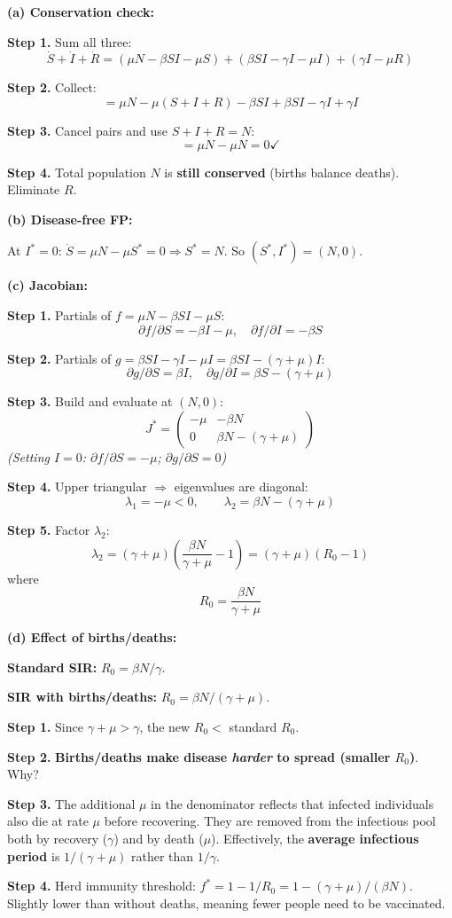 \documentclass[10pt]{article}
\newcommand{\stepwhy}[1]{\textcolor{blue!60!black}{\small\textit{(#1)}}}
\begin{document}
\begin{solution}
\textbf{(a) Conservation check:}

\textbf{Step 1.} Sum all three:
\[
\dot S + \dot I + \dot R = (\mu N - \beta SI - \mu S) + (\beta SI - \gamma I - \mu I) + (\gamma I - \mu R)
\]

\textbf{Step 2.} Collect:
\[
= \mu N - \mu(S + I + R) - \beta SI + \beta SI - \gamma I + \gamma I
\]

\textbf{Step 3.} Cancel pairs and use $S+I+R = N$:
\[
= \mu N - \mu N = 0 \checkmark
\]

\textbf{Step 4.} Total population $N$ is \textbf{still conserved} (births balance deaths). Eliminate $R$.

\medskip\textbf{(b) Disease-free FP:}

At $I^* = 0$: $\dot S = \mu N - \mu S^* = 0 \Rightarrow S^* = N$. So $(S^*, I^*) = (N, 0)$.

\medskip\textbf{(c) Jacobian:}

\textbf{Step 1.} Partials of $f = \mu N - \beta SI - \mu S$:
\[
\partial f/\partial S = -\beta I - \mu, \quad \partial f/\partial I = -\beta S
\]

\textbf{Step 2.} Partials of $g = \beta SI - \gamma I - \mu I = \beta SI - (\gamma+\mu)I$:
\[
\partial g/\partial S = \beta I, \quad \partial g/\partial I = \beta S - (\gamma+\mu)
\]

\textbf{Step 3.} Build and evaluate at $(N, 0)$:
\[
J^* = \begin{pmatrix} -\mu & -\beta N \\ 0 & \beta N - (\gamma+\mu) \end{pmatrix}
\]
\stepwhy{Setting $I=0$: $\partial f/\partial S = -\mu$; $\partial g/\partial S = 0$}

\textbf{Step 4.} Upper triangular $\Rightarrow$ eigenvalues are diagonal:
\[
\lambda_1 = -\mu < 0, \qquad \lambda_2 = \beta N - (\gamma+\mu)
\]

\textbf{Step 5.} Factor $\lambda_2$:
\[
\lambda_2 = (\gamma+\mu)\left(\frac{\beta N}{\gamma+\mu} - 1\right) = (\gamma+\mu)(R_0 - 1)
\]
where
\[
\boxed{R_0 = \frac{\beta N}{\gamma + \mu}}
\]

\medskip\textbf{(d) Effect of births/deaths:}

\textbf{Standard SIR:} $R_0 = \beta N/\gamma$.

\textbf{SIR with births/deaths:} $R_0 = \beta N/(\gamma + \mu)$.

\textbf{Step 1.} Since $\gamma + \mu > \gamma$, the new $R_0 < $ standard $R_0$.

\textbf{Step 2.} \textbf{Births/deaths make disease \emph{harder} to spread (smaller $R_0$)}. Why?

\textbf{Step 3.} The additional $\mu$ in the denominator reflects that infected individuals also die at rate $\mu$ before recovering. They are removed from the infectious pool both by recovery ($\gamma$) and by death ($\mu$). Effectively, the \textbf{average infectious period} is $1/(\gamma+\mu)$ rather than $1/\gamma$.

\textbf{Step 4.} Herd immunity threshold: $f^* = 1 - 1/R_0 = 1 - (\gamma+\mu)/(\beta N)$. Slightly lower than without deaths, meaning fewer people need to be vaccinated.
\end{solution}
\end{document}

